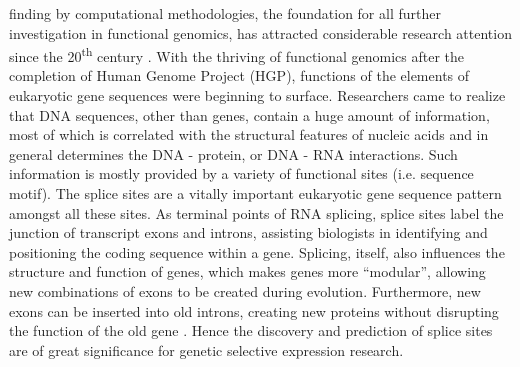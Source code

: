 \documentclass[journal,twoside]{IEEEtran}
\begin{document}
 finding by computational methodologies, the foundation for all further investigation in functional genomics, has attracted considerable research attention since the 20\textsuperscript{th} century \cite{burge1997prediction}. With the thriving of functional genomics after the completion of Human Genome Project (HGP), functions of the elements of eukaryotic gene sequences were beginning to surface. Researchers came to realize that DNA sequences, other than genes, contain a huge amount of information, most of which is correlated with the structural features of nucleic acids and in general determines the DNA - protein, or DNA - RNA interactions. Such information is mostly provided by a variety of functional sites (i.e. sequence motif). The splice sites are a vitally important eukaryotic gene sequence pattern amongst all these sites. As terminal points of RNA splicing, splice sites label the junction of transcript exons and introns, assisting biologists in identifying and positioning the coding sequence within a gene. Splicing, itself, also influences the structure and function of genes, which makes genes more ``modular'', allowing new combinations of exons to be created during evolution. Furthermore, new exons can be inserted into old introns, creating new proteins without disrupting the function of the old gene \cite{clancy2008rna}. Hence the discovery and prediction of splice sites are of great significance for genetic selective expression research. 
\end{document}
